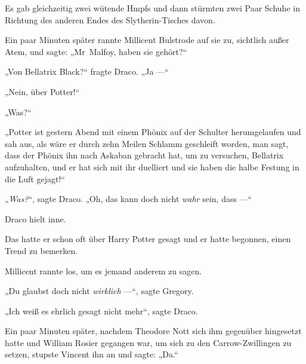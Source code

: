 Es gab gleichzeitig zwei wütende Hmpfs und dann stürmten zwei Paar Schuhe in Richtung des anderen Endes des Slytherin-Tisches davon.

Ein paar Minuten später rannte Millicent Bulstrode auf sie zu, sichtlich außer Atem, und sagte:
„Mr~Malfoy, haben sie gehört?“

„Von Bellatrix Black?“ fragte Draco.
„Ja —“

„Nein, über Potter!“

„Was?“

„Potter ist gestern Abend mit einem Phönix auf der Schulter herumgelaufen und sah aus, als wäre er durch zehn Meilen Schlamm geschleift worden, man sagt, dass der Phönix ihn nach Askaban gebracht hat, um zu versuchen, Bellatrix aufzuhalten, und er hat sich mit ihr duelliert und sie haben die halbe Festung in die Luft gejagt!“

„\emph{Was?}“, sagte Draco.
„Oh, das kann doch nicht \emph{wahr} sein, dass —“

Draco hielt inne.

Das hatte er schon oft über Harry Potter gesagt und er hatte begonnen, einen Trend zu bemerken.

Millicent rannte los, um es jemand anderem zu sagen.

„Du glaubst doch nicht \emph{wirklich} —“, sagte Gregory.

„Ich weiß es ehrlich gesagt nicht mehr“, sagte Draco.

Ein paar Minuten später, nachdem Theodore Nott sich ihm gegenüber hingesetzt hatte und William Rosier gegangen war, um sich zu den Carrow-Zwillingen zu setzen, stupste Vincent ihn an und sagte:
„Da.“

